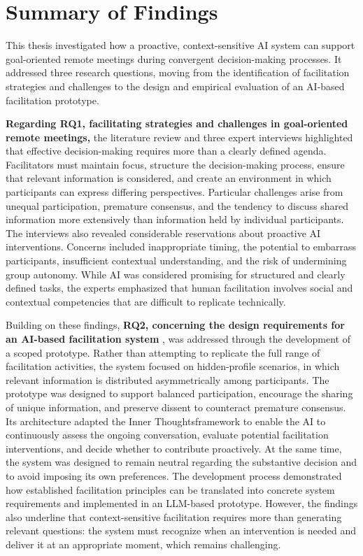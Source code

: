 \section{Summary of Findings}

This thesis investigated how a proactive, context-sensitive AI system can support goal-oriented remote
meetings during convergent decision-making processes. It addressed three research questions, moving from the
identification of facilitation strategies and challenges to the design and empirical evaluation of an
AI-based facilitation prototype.

\textbf{Regarding RQ1, facilitating strategies and challenges in goal-oriented remote meetings,} the literature review
and three expert interviews highlighted that effective decision-making requires more than a clearly defined
agenda. Facilitators must maintain focus, structure the decision-making process, ensure that relevant
information is considered, and create an environment in which participants can express differing
perspectives. Particular challenges arise from unequal participation, premature consensus, and the tendency
to discuss shared information more extensively than information held by individual participants. The
interviews also revealed considerable reservations about proactive AI interventions. Concerns included
inappropriate timing, the potential to embarrass participants, insufficient contextual understanding, and the
risk of undermining group autonomy. While AI was considered promising for structured and clearly defined
tasks, the experts emphasized that human facilitation involves social and contextual competencies that are
difficult to replicate technically.

Building on these findings, \textbf{RQ2, concerning the design requirements for an AI-based facilitation system} , was
addressed through the development of a scoped prototype. Rather than attempting to replicate the full range
of facilitation activities, the system focused on hidden-profile scenarios, in which relevant information is
distributed asymmetrically among participants. The prototype was designed to support balanced participation,
encourage the sharing of unique information, and preserve dissent to counteract premature consensus. Its
architecture adapted the Inner Thoughtsframework to enable the AI to continuously assess the ongoing
conversation, evaluate potential facilitation interventions, and decide whether to contribute proactively. At
the same time, the system was designed to remain neutral regarding the substantive decision and to avoid
imposing its own preferences. The development process demonstrated how established facilitation principles
can be translated into concrete system requirements and implemented in an LLM-based prototype. However, the
findings also underline that context-sensitive facilitation requires more than generating relevant questions:
the system must recognize when an intervention is needed and deliver it at an appropriate moment, which
remains challenging.

